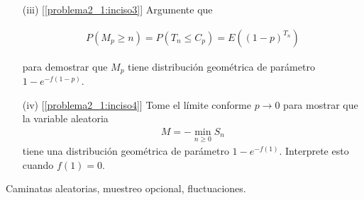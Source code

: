 \begin{problema}
\begin{enumerate}
                    \begin{align}
                        T_k =\min \{n\in\na:S_n=-k\} 
                    \end{align}
                    
                    (donde se utiliza la convenci\'on $\inf\emptyset=\infty$ ). Aplique el teorema de muestreo opcional de Doob para mostrar que 
                    
                    \begin{align}
                        E(s^{T_k})=e^{-k f(s)}.
                    \end{align}
                    
                    Justifique MUY bien por qu\'e la f\'ormula es válida aún cuando $T_k$ puede tomar el valor $\infty$ 
                    y deduzca que de hecho $\p (T_k=\infty)=0$.
                        
        \item[(iii)] [\ref{problema2_1:inciso3}]
                    Argumente que
        
                    \begin{align}
                        P(M_p\geq n)=P(T_n\leq C_p)=E((1-p)^{T_n})
                    \end{align}
                    
                    para demostrar que $M_p$ tiene distribuci\'on geom\'etrica de par\'ametro $1-e^{-f(1-p)}$.
                    
        \item[(iv)] [\ref{problema2_1:inciso4}]
                    Tome el límite conforme $p\to 0$ para mostrar que la variable aleatoria 
                    \begin{align}
                        M=-\min_{n\geq 0}S_n
                    \end{align}
                    tiene una distribuci\'on geom\'etrica de par\'ametro $1-e^{-f(1)}$. Interprete esto cuando $f(1)=0$.
    \end{enumerate}

         Caminatas aleatorias, muestreo opcional, fluctuaciones.
\end{problema}


